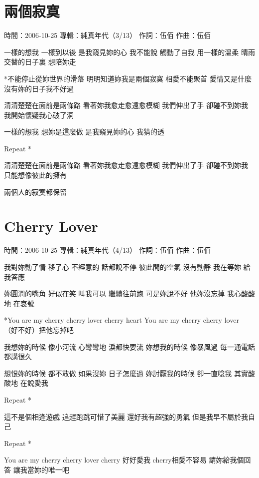 \documentclass[UTF8,a4paper,oneside,twocolumn,12pt]{ctexbook}
\newcommand{\infopair}[2]{\textbullet #1：#2}
\newcommand{\zc}[1][伍佰]{\infopair{作詞}{#1}}
\newcommand{\zq}[1][伍佰]{\infopair{作曲}{#1}}
\newcommand{\zj}[1]{\infopair{專輯}{#1}}
\newcommand{\sj}[1]{\infopair{時間}{#1}}
\newenvironment{info}{\begin{flushleft}\kaishu
	}
	{\end{flushleft}\normalsize\yahei\par}
\newenvironment{lyric}{
	}
{}
\begin{document}
\section{兩個寂寞}
\begin{info}
	\sj{2006-10-25}
	\zj{純真年代（3/13）}
	\zc
	\zq
\end{info}
\begin{lyric}
	一樣的想我 一樣到以後 是我窺見妳的心 我不能說
	觸動了自我 用一樣的溫柔 晴雨交替的日子裏 想陪妳走

	*不能停止從妳世界的滑落 明明知道妳我是兩個寂寞
	相愛不能聚首 愛情又是什麼 沒有妳的日子我不好過

	清清楚楚在面前是兩條路 看著妳我愈走愈遠愈模糊
	我們伸出了手 卻碰不到妳我 我開始懷疑我心破了洞

	一樣的想我 想妳是這麼做 是我窺見妳的心 我猜的透

	Repeat *

	清清楚楚在面前是兩條路 看著妳我愈走愈遠愈模糊
	我們伸出了手 卻碰不到妳我 只能想像彼此的擁有

	兩個人的寂寞都保留
\end{lyric}

\section{Cherry Lover}
\begin{info}
	\sj{2006-10-25}
	\zj{純真年代（4/13）}
	\zc
	\zq
\end{info}
\begin{lyric}
	我對妳動了情 移了心 不經意的 話都說不停
	彼此間的空氣 沒有動靜 我在等妳 給我答應

	妳圓潤的嘴角 好似在笑 叫我可以 繼續往前跑
	可是妳說不好 他妳沒忘掉 我心酸酸地 在哀號

	*You are my cherry cherry lover cherry heart
	You are my cherry cherry lover （好不好）把他忘掉吧

	我想妳的時候 像小河流 心彎彎地 淚都快要流
	妳想我的時候 像暴風過 每一通電話 都講很久

	想恨妳的時候 都不敢做 如果沒妳 日子怎麼過
	妳討厭我的時候 卻一直唸我 其實酸酸地 在說愛我

	Repeat *

	這不是個相逢遊戲 追趕跑跳可惜了美麗
	還好我有超強的勇氣 但是我早不屬於我自己

	Repeat *

	You are my cherry cherry lover cherry 好好愛我
	cherry相愛不容易 請妳給我個回答 讓我當妳的唯一吧
\end{lyric}
\end{document}
